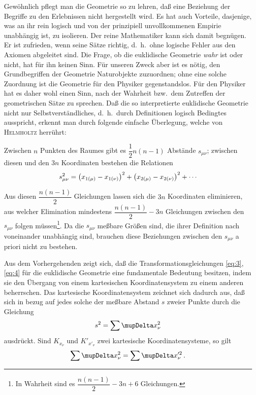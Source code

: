 Gewöhnlich pflegt man die Geometrie so zu lehren, daß eine Beziehung der 
Begriffe zu den Erlebnissen nicht hergestellt wird. Es hat auch Vorteile, 
dasjenige, was an ihr rein logisch und von der prinzipiell unvollkommenen 
Empirie unabhängig ist, zu isolieren. Der reine Mathematiker kann sich damit 
begnügen. Er ist zufrieden, wenn seine Sätze richtig, d.\ h.\ ohne logische
Fehler aus den Axiomen abgeleitet sind. Die Frage, ob die euklidische 
Geometrie \emph{wahr} ist oder nicht, hat für ihn keinen Sinn. Für unseren 
Zweck aber ist es nötig, den Grundbegriffen der Geometrie Naturobjekte 
zuzuordnen; ohne eine solche Zuordnung ist die Geometrie für den Physiker 
gegenstandslos. Für den Physiker hat es daher wohl einen Sinn, nach der 
Wahrheit bzw.\ dem Zutreffen der geometrischen Sätze zu sprechen. Daß die so 
interpretierte euklidische Geometrie nicht nur Selbstverständliches, d.\ h.\ 
durch Definitionen logisch Bedingtes ausspricht, erkennt man durch folgende 
einfache Überlegung, welche von \textsc{Helmholtz} herrührt:

Zwischen $n$ Punkten des Raumes gibt es $\dfrac{1}{2} n(n-1)$ Abstände 
$s_{\mu\nu}$; zwischen diesen und den $3n$ Koordinaten bestehen die Relationen
\begin{align}
s_{\mu\nu}^2 = {\left(x_{1(\mu)} - x_{1(\nu)}\right)}^2 +
	{\left(x_{2(\mu)} - x_{2(\nu)}\right)}^2 + \cdots
\end{align}

Aus diesen $\dfrac{n(n-1)}{2}$ Gleichungen lassen sich die $3n$ Koordinaten
eliminieren, aus welcher Elimination mindestens $\dfrac{n(n-1)}{2} - 3n$ 
Gleichungen zwischen den $s_{\mu\nu}$ folgen müssen\footnote{In Wahrheit sind 
es $\dfrac{n(n-1)}{2} - 3n + 6$ Gleichungen.}. Da die $s_{\mu\nu}$ meßbare 
Größen sind, die ihrer Definition nach voneinander unabhängig sind, brauchen 
diese Beziehungen zwischen den $s_{\mu\nu}$ a priori nicht zu bestehen.

Aus dem Vorhergehenden zeigt sich, daß die Transformationsgleichungen 
\eqref{eq:3}, \eqref{eq:4} für die euklidische Geometrie eine fundamentale 
Bedeutung besitzen, indem sie den Übergang von einem kartesischen 
Koordinatensystem zu einem anderen beherrschen. Das kartesische 
Koordinatensystem zeichnet sich dadurch aus, daß sich in bezug auf jedes solche 
der meßbare Abstand $s$ zweier Punkte durch die Gleichung
\begin{align*}
s^2 = \sum \Dva x_{\nu}^2
\end{align*}
ausdrückt. Sind $K_{x_{\nu}}$ und $K'_{x'_{\nu}}$ zwei kartesische 
Koordinatensysteme, so gilt
\begin{align*}
\sum \Dva x_{\nu}^2 = \sum \Dva x^{\prime 2}_{\nu}\,.
\end{align*}


